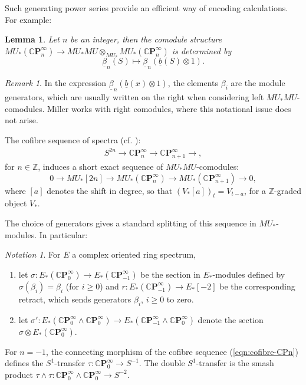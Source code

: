 \documentclass[10pt,a4paper]{amsart}
\newtheorem{lem}[thm]{Lemma}
\theoremstyle{definition}
\theoremstyle{remark}
\newtheorem{rem}[thm]{Remark}
\newtheorem{nota}[thm]{Notation}
\newcommand{\zed}{\mathbb{Z}}
\newcommand{\cp}{\mathbb{C} \mathbf{P}^\infty}
\renewcommand{\smash}{\wedge}
\begin{document}
Such generating power series provide an efficient way of encoding calculations. For example:

\begin{lem}
\label{lem:comodule_cpn}
\cite[Proposition 3.3]{miller}
Let  $n$  be an integer, then the comodule structure $MU_* (\cp_n) \rightarrow MU_* MU \otimes_{MU_*} MU_*
(\cp_n)$ is determined by
\[
 \underline{\beta}_n (S)
\mapsto
\underline{\beta}_n (\underline{b} (S) \otimes 1).
\]
\end{lem}


\begin{rem}
In the expression $\underline{\beta}_n (\underline{b} (x) \otimes 1)$, the elements $\beta_i$ are  the
module generators, which are usually written on the right when considering  left $MU_*MU$-comodules.
Miller \cite{miller} works with right comodules, where this notational issue does not arise.
\end{rem}

The cofibre sequence of spectra (cf. \cite[section 2]{miller}):
\begin{eqnarray}
\label{eqn:cofibre-CPn}
S^{2n}
\rightarrow \cp_{n}
\rightarrow \cp_{n+1}
\rightarrow,
\end{eqnarray}
for $n \in \zed$, induces a short exact sequence of $MU_*MU$-comodules:
\[
0
\rightarrow
MU_* [2n]
\rightarrow
MU_* (\cp_n)
\rightarrow
MU_*(\cp_{n+1})
\rightarrow
0,
\]
where  $[a]$ denotes the shift in degree, so that $(V_* [a])_t = V_{t-a}$, for a $\zed$-graded object $V_*$.


The choice of generators  gives a standard splitting of this sequence in $MU_*$-modules. In particular:

\begin{nota}
\label{nota:sigma}
For $E$ a complex oriented ring spectrum,
\begin{enumerate}
	\item
let $\sigma : E_ * (\cp_0) \rightarrow E_* (\cp_{-1})$ be the section in $E_*$-modules
 defined by $\sigma (\beta_i) = \beta_i$ (for $i \geq 0$) and  $r : E_* (\cp_{-1}) \rightarrow E_*[-2]$
be  the corresponding retract, which  sends generators $\beta_i$, $i \geq 0$ to zero.
\item
let $\sigma' : E_ * (\cp_0 \smash \cp_0) \rightarrow E_* (\cp_{-1} \smash \cp_0)$ denote the section $\sigma \otimes E_* (\cp_0)$.
\end{enumerate}
\end{nota}




For $n=-1$, the connecting morphism of the cofibre sequence (\ref{eqn:cofibre-CPn}) defines  the $S^1$-transfer
$\tau : \cp_{0}\rightarrow S^{-1}$. The double $S^1$-transfer is
the smash product
$
	\tau \smash \tau :
\cp_{0} \smash \cp_0 \rightarrow S^{-2}.
$
\end{document}
